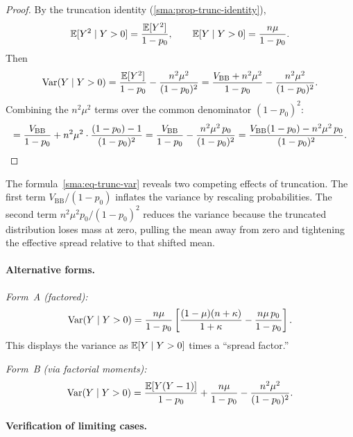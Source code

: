 \begin{proof}
  By the truncation identity (\cref{sma:prop-trunc-identity}),
  \[
    \mathbb{E}[Y^2 \mid Y > 0] = \frac{\mathbb{E}[Y^2]}{1 - p_0},
    \qquad
    \mathbb{E}[Y \mid Y > 0] = \frac{n\mu}{1 - p_0}.
  \]
  Then
  \[
    \operatorname*{Var}(Y \mid Y > 0)
    = \frac{\mathbb{E}[Y^2]}{1-p_0} - \frac{n^2\mu^2}{(1-p_0)^2}
    = \frac{V_{\mathrm{BB}} + n^2\mu^2}{1-p_0}
      - \frac{n^2\mu^2}{(1-p_0)^2}.
  \]
  Combining the $n^2\mu^2$ terms over the common denominator $(1-p_0)^2$:
  \[
    = \frac{V_{\mathrm{BB}}}{1-p_0}
      + n^2\mu^2 \cdot \frac{(1-p_0) - 1}{(1-p_0)^2}
    = \frac{V_{\mathrm{BB}}}{1-p_0}
      - \frac{n^2\mu^2\,p_0}{(1-p_0)^2}
    = \frac{V_{\mathrm{BB}}(1-p_0) - n^2\mu^2\,p_0}{(1-p_0)^2}.
    \qedhere
  \]
\end{proof}

\begin{remark}\label{sma:rem-competing-effects}
  The formula~\eqref{sma:eq-trunc-var} reveals two competing effects of
  truncation.  The first term $V_{\mathrm{BB}}/(1-p_0)$ inflates the
  variance by rescaling probabilities.  The second term
  $n^2\mu^2 p_0/(1-p_0)^2$ reduces the variance because the truncated
  distribution loses mass at zero, pulling the mean away from zero and
  tightening the effective spread relative to that shifted mean.
\end{remark}

\paragraph{Alternative forms.}

\emph{Form~A (factored):}
\begin{equation}\label{sma:eq-trunc-var-formA}
  \operatorname*{Var}(Y \mid Y > 0)
  = \frac{n\mu}{1-p_0}
    \left[\frac{(1-\mu)(n+\kappa)}{1+\kappa}
          - \frac{n\mu\,p_0}{1-p_0}\right].
\end{equation}
This displays the variance as $\mathbb{E}[Y \mid Y > 0]$ times a ``spread factor.''

\emph{Form~B (via factorial moments):}
\begin{equation}\label{sma:eq-trunc-var-formB}
  \operatorname*{Var}(Y \mid Y > 0)
  = \frac{\mathbb{E}[Y(Y-1)]}{1-p_0}
    + \frac{n\mu}{1-p_0}
    - \frac{n^2\mu^2}{(1-p_0)^2}.
\end{equation}

\paragraph{Verification of limiting cases.}

